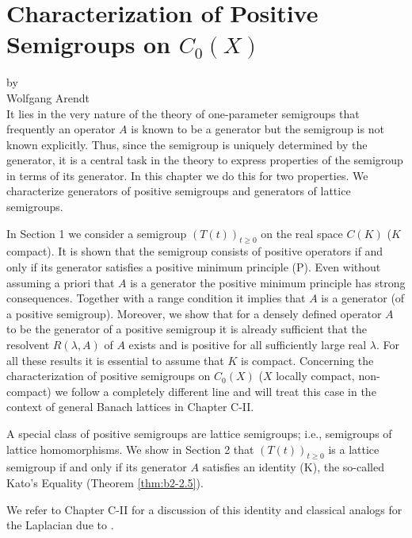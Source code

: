 \chapter{Characterization of Positive Semigroups on \texorpdfstring{$C_{0}(X)$}{C(X)}}
\label{chap:b2}
{\Large
\vspace*{-.75cm}
by \\[.25em]
Wolfgang Arendt 
\vspace{.75cm}
\\
}
It lies in the very nature of the theory of one-parameter semigroups that frequently an operator $A$ is known to be a generator but the semigroup is not known explicitly.
Thus, since the semigroup is uniquely determined by the generator, it is a central task in the theory to express properties of the semigroup in terms of its generator.
In this chapter we do this for two properties.
We characterize generators of positive semigroups and generators of lattice semigroups.

In Section 1 we consider a semigroup $(T(t))_{t \geq 0}$ on the real space $C(K)$ ($K$ compact).
It is shown that the semigroup consists of positive operators if and only if its generator satisfies a positive minimum principle (P).
Even without assuming a priori that $A$ is a generator the positive minimum principle has strong consequences.
Together with a range condition it implies that $A$ is a generator (of a positive semigroup).
Moreover, we show that for a densely defined operator $A$ to be the generator of a positive semigroup it is already sufficient that the resolvent $R(\lambda,A)$ of $A$ exists and is positive for all sufficiently large real $\lambda$.
For all these results it is essential to assume that $K$ is compact.
Concerning the characterization of positive semigroups on $C_{0}(X)$ ($X$ locally compact, non-compact) we follow a completely different line and will treat this case in the context of general Banach lattices in Chapter C-II.

A special class of positive semigroups are lattice semigroups; i.e., semigroups of lattice homomorphisms.
We show in Section 2 that $(T(t))_{t \geq 0}$ is a lattice semigroup if and only if its generator $A$ satisfies an identity (K), the so-called Kato's Equality (Theorem \ref{thm:b2-2.5}).

We refer to Chapter C-II for a discussion of this identity and classical analogs for the Laplacian due to \citet{kato:1973}.

